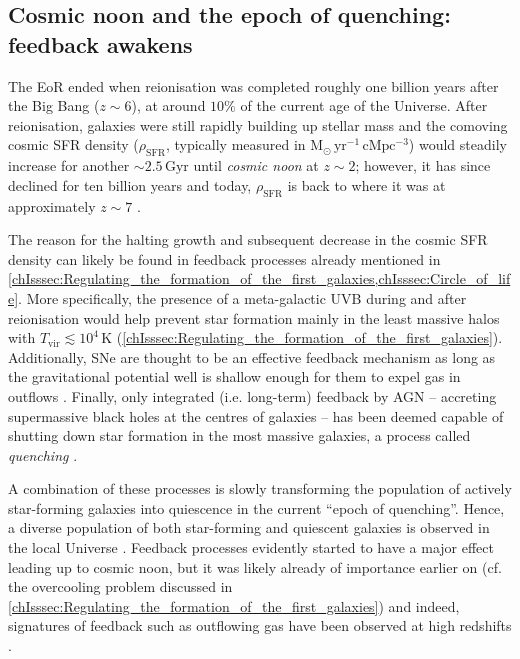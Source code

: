 \subsection{Cosmic noon and the epoch of quenching: feedback awakens}
\label{chIssec:Cosmic_noon_and_the_epoch_of_quenching}

The EoR ended when reionisation was completed roughly one billion years after the Big Bang ($z \sim 6$), at around $10\%$ of the current age of the Universe. After reionisation, galaxies were still rapidly building up stellar mass and the comoving cosmic SFR density ($\rho_\text{SFR}$, typically measured in $\mathrm{M_\odot \, yr^{-1} \, cMpc^{-3}}$) would steadily increase for another $\sim 2.5 \, \mathrm{Gyr}$ until \textit{cosmic noon} at $z \sim 2$; however, it has since declined for ten billion years and today, $\rho_\text{SFR}$ is back to where it was at approximately $z \sim 7$ \citep{2014ARA&A..52..415M}.

The reason for the halting growth and subsequent decrease in the cosmic SFR density can likely be found in feedback processes already mentioned in \cref{chIsssec:Regulating_the_formation_of_the_first_galaxies,chIsssec:Circle_of_life}. More specifically, the presence of a meta-galactic UVB during and after reionisation \citep{2012ApJ...746..125H} would help prevent star formation mainly in the least massive halos with $T_\text{vir} \lesssim 10^4 \, \mathrm{K}$ (\cref{chIsssec:Regulating_the_formation_of_the_first_galaxies}). Additionally, SNe are thought to be an effective feedback mechanism as long as the gravitational potential well is shallow enough for them to expel gas in outflows \citep{2015MNRAS.446..521S}. Finally, only integrated (i.e. long-term) feedback by AGN -- accreting supermassive black holes at the centres of galaxies -- has been deemed capable of shutting down star formation in the most massive galaxies, a process called \textit{quenching} \citep[e.g.][]{2022MNRAS.512.1052P}.

A combination of these processes is slowly transforming the population of actively star-forming galaxies into quiescence in the current ``epoch of quenching''. Hence, a diverse population of both star-forming and quiescent galaxies is observed in the local Universe \citep{2010ApJ...721..193P}. Feedback processes evidently started to have a major effect leading up to cosmic noon, but it was likely already of importance earlier on (cf. the overcooling problem discussed in \cref{chIsssec:Regulating_the_formation_of_the_first_galaxies}) and indeed, signatures of feedback such as outflowing gas have been observed at high redshifts \citep[e.g.][]{2022ApJ...934...64A}.

